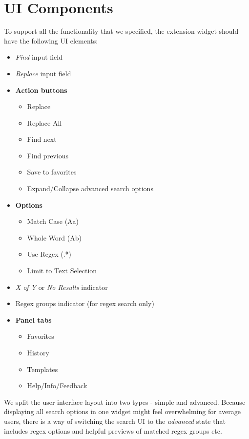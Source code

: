\documentclass[bsc,frontabs,twoside,singlespacing,parskip,deptreport]{infthesis}
\providecommand{\tightlist}{%
  \setlength{\itemsep}{0pt}\setlength{\parskip}{0pt}}
\begin{document}
\section{UI Components}
To support all the functionality that we specified, the extension widget should have the following UI elements:
\begin{itemize}
\tightlist
\item
  \textit{Find} input field
\item
  \textit{Replace} input field
\item
  \textbf{Action buttons}

  \begin{itemize}
  \tightlist
  \item
    Replace
  \item
    Replace All
  \item
    Find next
  \item
    Find previous
  \item
    Save to favorites
  \item
  	Expand/Collapse advanced search options
  \end{itemize}
\item
  \textbf{Options}

  \begin{itemize}
  \tightlist
  \item
    Match Case (Aa)
  \item
    Whole Word (Ab\textbar{})
  \item
    Use Regex (.*)
  \item
    Limit to Text Selection
  \end{itemize}
\item
  \textit{X of Y} or \textit{No Results} indicator
\item
  Regex groups indicator (for regex search only)
\item
  \textbf{Panel tabs}

  \begin{itemize}
  \item
    Favorites
  \item
    History
  \item
    Templates
  \item
    Help/Info/Feedback
  \end{itemize}
\end{itemize}

We split the user interface layout into two types - simple and advanced. Because displaying all search options in one widget might feel overwhelming for average users, there is a way of switching the search UI to the \textit{advanced} state that includes regex options and helpful previews of matched regex groups etc.
\end{document}
